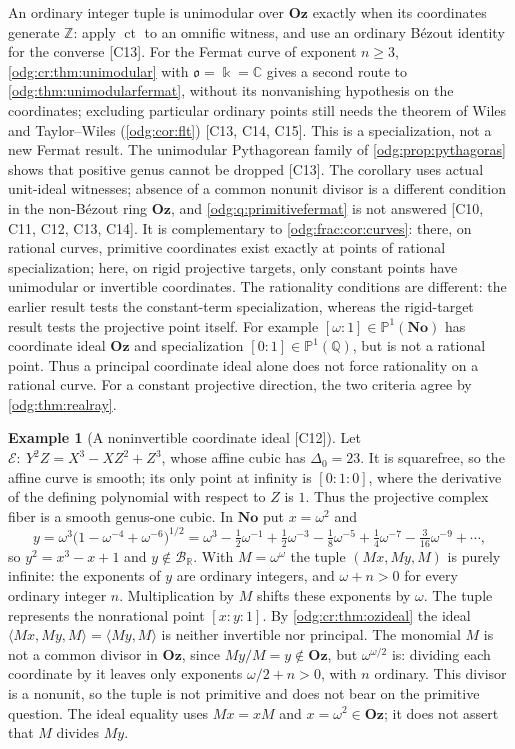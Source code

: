 \documentclass[11pt,oneside]{article}
\numberwithin{equation}{section}
\theoremstyle{definition}
\newtheorem{example}[example]{Example}
\theoremstyle{remark}
\newcommand{\No}{\mathbf{No}}
\newcommand{\Oz}{\mathbf{Oz}}
\newcommand{\Z}{\mathbb Z}
\newcommand{\Q}{\mathbb Q}
\newcommand{\R}{\mathbb R}
\newcommand{\C}{\mathbb C}
\newcommand{\BR}{\mathcal B_{\R}}
\newcommand{\ct}{\operatorname{ct}}
\newcommand{\src}[1]{\textup{\textsf{\small[#1]}}}
\begin{document}
An ordinary integer tuple is unimodular over $\Oz$ exactly when its coordinates
generate $\Z$: apply $\ct$ to an omnific witness, and use an ordinary B\'ezout
identity for the converse \src{C13}. For the Fermat curve of exponent $n\ge3$,
\cref{odg:cr:thm:unimodular} with $\mathfrak o=\Bbbk=\C$ gives a second route to
\cref{odg:thm:unimodularfermat}, without its nonvanishing hypothesis on the
coordinates; excluding particular ordinary
points still needs the theorem of Wiles and Taylor--Wiles (\cref{odg:cor:flt})
\src{C13, C14, C15}. This is a specialization, not a new Fermat result. The unimodular
Pythagorean family of \cref{odg:prop:pythagoras} shows that positive genus cannot be
dropped \src{C13}. The corollary uses actual unit-ideal witnesses; absence of a
common nonunit divisor is a different condition in the non-B\'ezout ring $\Oz$, and
\cref{odg:q:primitivefermat} is not answered \src{C10, C11, C12, C13, C14}. It is
complementary to \cref{odg:frac:cor:curves}: there, on rational curves, primitive
coordinates exist exactly at points of rational specialization; here, on rigid
projective targets, only constant points have unimodular or invertible coordinates.
The rationality conditions are different: the earlier result tests the
constant-term specialization, whereas the rigid-target result tests the
projective point itself. For example $[\omega:1]\in\mathbb P^1(\No)$ has
coordinate ideal $\Oz$ and specialization $[0:1]\in\mathbb P^1(\Q)$, but
is not a rational point. Thus a principal coordinate ideal alone does not
force rationality on a rational curve. For a constant projective direction,
the two criteria agree by \cref{odg:thm:realray}.

\begin{example}[A noninvertible coordinate ideal \src{C12}]\label{odg:cr:ex:denominator}
Let $\mathcal E:\ Y^2Z=X^3-XZ^2+Z^3$, whose affine cubic has $\Delta_0=23$.
It is squarefree, so the affine curve is smooth; its only point at infinity
is $[0:1:0]$, where the derivative of the defining polynomial with respect
to $Z$ is $1$. Thus the projective complex fiber is a smooth genus-one cubic.
In $\No$
put $x=\omega^2$ and
\[
 y=\omega^3\bigl(1-\omega^{-4}+\omega^{-6}\bigr)^{1/2}
 =\omega^3-\tfrac12\omega^{-1}+\tfrac12\omega^{-3}-\tfrac18\omega^{-5}
 +\tfrac14\omega^{-7}-\tfrac3{16}\omega^{-9}+\cdots,
\]
so $y^2=x^3-x+1$ and $y\notin\BR$. With $M=\omega^\omega$ the tuple
$(Mx,My,M)$ is purely infinite: the exponents of $y$ are ordinary integers,
and $\omega+n>0$ for every ordinary integer $n$. Multiplication by $M$ shifts
these exponents by $\omega$. The tuple
represents the nonrational point $[x:y:1]$. By \cref{odg:cr:thm:ozideal} the ideal
$\langle Mx,My,M\rangle=\langle My,M\rangle$ is neither invertible nor principal. The
monomial $M$ is not a common divisor in $\Oz$, since $My/M=y\notin\Oz$, but
$\omega^{\omega/2}$ is: dividing each coordinate by it leaves only exponents
$\omega/2+n>0$, with $n$ ordinary. This divisor is a nonunit, so the tuple is
not primitive and does not bear on the primitive question. The ideal equality
uses $Mx=xM$ and $x=\omega^2\in\Oz$; it does not assert that $M$ divides $My$.
\end{example}
\end{document}
